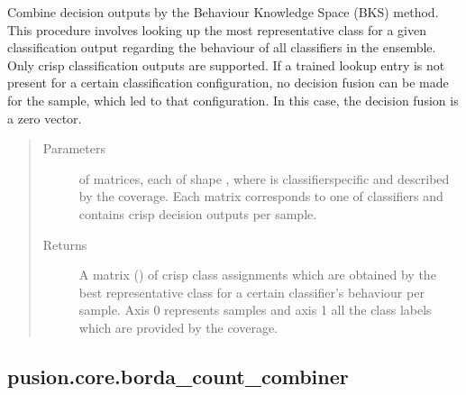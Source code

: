 \documentclass[letterpaper,10pt,english]{sphinxmanual}
\begin{document}
\begin{fulllineitems}
\begin{fulllineitems}
\label{\detokenize{pusion.core.behaviour_knowledge_space_combiner:pusion.core.behaviour_knowledge_space_combiner.CRBehaviourKnowledgeSpaceCombiner.combine}}
\sphinxAtStartPar
Combine decision outputs by the Behaviour Knowledge Space (BKS) method. This procedure involves looking up the
most representative class for a given classification output regarding the behaviour of all classifiers in the
ensemble. Only crisp classification outputs are supported. If a trained lookup entry is not present for a
certain classification configuration, no decision fusion can be made for the sample, which led to that
configuration. In this case, the decision fusion is a zero vector.
\begin{quote}\begin{description}
\item[{Parameters}] \leavevmode
\sphinxAtStartPar
{} \textendash{}  of  matrices, each of shape ,
where  is classifier\sphinxhyphen{}specific and described by the coverage.
Each matrix corresponds to one of  classifiers and contains crisp decision outputs
per sample.

\item[{Returns}] \leavevmode
\sphinxAtStartPar
A matrix () of crisp class assignments which are obtained by the best representative class
for a certain classifier’s behaviour per sample. Axis 0 represents samples and axis 1 all the class
labels which are provided by the coverage.

\end{description}\end{quote}

\end{fulllineitems}


\end{fulllineitems}



\subsection{pusion.core.borda\_count\_combiner}
\label{\detokenize{pusion.core.borda_count_combiner:module-pusion.core.borda_count_combiner}}\label{\detokenize{pusion.core.borda_count_combiner:pusion-core-borda-count-combiner}}\label{\detokenize{pusion.core.borda_count_combiner:bc-cref}}\label{\detokenize{pusion.core.borda_count_combiner::doc}}
\end{document}

